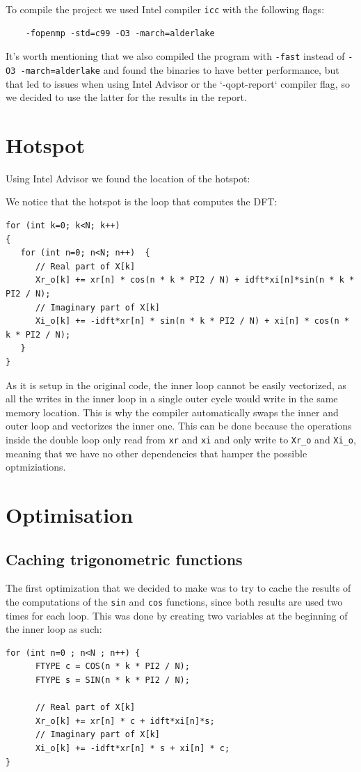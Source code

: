 \documentclass{article}
\begin{document}
To compile the project we used Intel compiler \texttt{icc} with the following flags:
\begin{verbatim}
    -fopenmp -std=c99 -O3 -march=alderlake
\end{verbatim}
It's worth mentioning that we also compiled the program with \verb|-fast| instead of \verb|-O3 -march=alderlake| and found the binaries to have better performance, but that led
to issues when using Intel Advisor or the `-qopt-report` compiler flag, so we decided to use the latter for the results in the report.

\newpage

\section{Hotspot}
Using Intel Advisor we found the location of the hotspot:


We notice that the hotspot is the loop that computes the DFT:

\begin{verbatim}
for (int k=0; k<N; k++)
{
   for (int n=0; n<N; n++)  {
      // Real part of X[k]
      Xr_o[k] += xr[n] * cos(n * k * PI2 / N) + idft*xi[n]*sin(n * k * PI2 / N);
      // Imaginary part of X[k]
      Xi_o[k] += -idft*xr[n] * sin(n * k * PI2 / N) + xi[n] * cos(n * k * PI2 / N);
   }
}
\end{verbatim}

As it is setup in the original code, the inner loop cannot be easily vectorized, as all the writes in the inner loop in a single outer cycle would write in the same memory location.
This is why the compiler automatically swaps the inner and outer loop and vectorizes the inner one. This can be done because the operations inside the double loop only read from \verb|xr| and \verb|xi| and only write to \verb|Xr_o| and \verb|Xi_o|, meaning that we have no other dependencies that hamper the possible optmiziations.

\section{Optimisation}

\subsection{Caching trigonometric functions}

The first optimization that we decided to make was to try to cache the results of the computations of the \verb|sin| and \verb|cos| functions, since both results are used two times for each loop. This was done by creating two variables at the beginning of the inner loop as such:
\begin{verbatim}
for (int n=0 ; n<N ; n++) {
      FTYPE c = COS(n * k * PI2 / N);
      FTYPE s = SIN(n * k * PI2 / N);

      // Real part of X[k]
      Xr_o[k] += xr[n] * c + idft*xi[n]*s;
      // Imaginary part of X[k]
      Xi_o[k] += -idft*xr[n] * s + xi[n] * c;
}
\end{verbatim}
\end{document}
